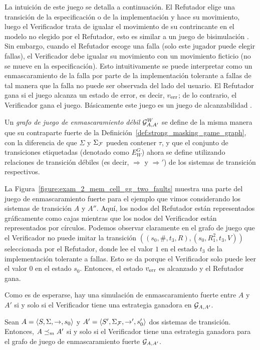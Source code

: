 La intuición de este juego se detalla a continuación. 
El Refutador elige una transición de la especificación o de la implementación y hace su movimiento, luego el Verificador trata de igualar el movimiento de su contrincante en el modelo no elegido por el Refutador, esto es similar a un juego de bisimulación \cite{Stirling99}. 
Sin embargo, cuando el Refutador escoge una falla (solo este jugador puede elegir fallas), el Verificador debe igualar su movimiento con un movimiento ficticio (no se mueve en la especificación).
Esto intuitivamente se puede interpretar como un enmascaramiento de la falla por parte de la implementación tolerante a fallas de tal manera que la falla no puede ser observada del lado del usuario. El Refutador gana si el juego alcanza un estado de error, es decir, $v_{\text{err}}$; de lo contrario, el Verificador gana el juego. 
Básicamente este juego es un juego de alcanzabilidad \cite{Jurd11}.

Un \emph{grafo de juego de enmascaramiento débil} $\mathcal{G}^W_{A,A'}$ se define de la misma manera que su contraparte fuerte de la 
Definición~\ref{def:strong_masking_game_graph}, con la diferencia de que
$\Sigma$ y $\Sigma_{\mathcal{F}}$ pueden contener $\tau$, y que el conjunto de transiciones etiquetadas (denotado como $E_W^G$) ahora se define utilizando relaciones de transición débiles (es decir, $\Rightarrow$ y $\Rightarrow'$) de los sistemas de transición respectivos.

La Figura~\ref{figure:exam_2_mem_cell_gg_two_faults} muestra una parte del juego de enmascaramiento fuerte para el ejemplo que vimos considerando los sistemas de transición $A$ y $A''$. Aquí, los nodos del Refutador están representados gráficamente como cajas mientras que los nodos del Verificador están representados por círculos.
Podemos observar claramente en el grafo de juego que el Verificador no puede imitar la transición $((s_0, \#, t_3, R),(s_0, R_1^2, t_3, V))$
seleccionada por el Refutador, donde lee el valor $1$ en el estado $t_3$ de la implementación tolerante a fallas. Esto se da porque el Verificador solo puede leer el valor $0$ en el estado $s_0$. 
Entonces, el estado $v_{\text{err}}$ es alcanzado y el Refutador gana.

Como es de esperarse, hay una simulación de enmascaramiento fuerte entre $A$ y $A'$
si y solo si el Verificador tiene una estrategia ganadora en $\mathcal{G}_{A, A'}$.

\begin{theorem} \label{thm:wingame_strat}
  Sean $A=\langle S, \Sigma, \rightarrow, s_0 \rangle$ y $A'=\langle S', \Sigma_{\mathcal{F}}, \rightarrow', s'_0 \rangle$ dos sistemas de transición.
  Entonces, $A \preceq_{m} A'$ si y solo si el Verificador tiene una estrategia ganadora para el grafo de juego de enmascaramiento fuerte $\mathcal{G}_{A, A'}$.
\end{theorem}

